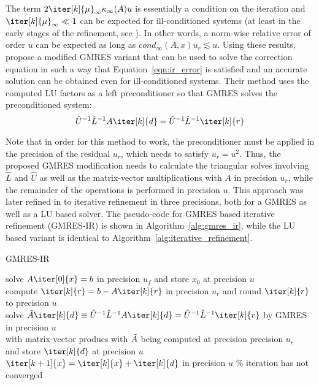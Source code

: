 \noindent The term $2\iter[k]{\mu}_\infty\kappa_\infty(A)u$ is essentially a condition on the iteration and $\iter[k]{\mu}_\infty \ll 1$ can be expected  for ill-conditioned systems (at least in the early stages of the refinement, see \cite{carson_new_2017}). In other words, a norm-wise relative error of order $u$ can be expected as long as $cond_\infty(A,x)u_r \lesssim u$. Using these results, \cite{carson_new_2017} propose a modified GMRES variant that can be used to solve the correction equation in such a way that Equation~\hyperref[eqn:ir_error]{\ref{eqn:ir_error}} is satisfied and an accurate solution can be obtained even for ill-conditioned systems.
Their method uses the computed LU factors as a left preconditioner so that GMRES solves the preconditioned system:
\begin{equation}
    \hat{U}^{-1}\hat{L}^{-1}A\iter[k]{d}=\hat{U}^{-1}\hat{L}^{-1}\iter[k]{r}
\end{equation}

\noindent Note that in order for this method to work, the preconditioner must be applied in the precision of the residual $u_r$, which needs to satisfy $u_r=u^2$. Thus, the proposed GMRES modification needs to calculate the triangular solves involving $\hat{L}$ and $\hat{U}$ as well as the matrix-vector multiplications with $A$ in precision $u_r$, while the remainder of the operations is performed in precision $u$. This approach was later refined in \cite{carson_accelerating_2018} to iterative refinement in three precisions, both for a GMRES as well as a LU based solver. The pseudo-code for GMRES based iterative refinement (GMRES-IR) is shown in Algorithm~\hyperref[alg:gmres_ir]{\ref{alg:gmres_ir}}, while the LU based variant is identical to Algorithm~\hyperref[alg:iterative_refinement]{\ref{alg:iterative_refinement}}.

\begin{algorithm}[h]
  \caption{GMRES-IR}
  \label{alg:gmres_ir}
  \SetAlgoLined
  solve $A\iter[0]{x}=b$ in precision $u_f$ and store $x_0$ at precision $u$ \\
   {
    compute $\iter[k]{r} = b-A\iter[k]{r}$ in precision $u_r$ and round $\iter[k]{r}$ to precision $u$ \\
    solve $\Tilde{A}\iter[k]{d}\equiv\hat{U}^{-1}\hat{L}^{-1}A\iter[k]{d}=\hat{U}^{-1}\hat{L}^{-1}\iter[k]{r}$ by GMRES in precision $u$ \\
    with matrix-vector producs with $\Tilde{A}$ being computed at precision precision $u_r$ \\
    and store $\iter[k]{d}$ at precision $u$ \\
    $\iter[k+1]{x}=\iter[k]{x}+\iter[k]{d}$ in precision $u$}
  \% iteration has not converged
\end{algorithm}

